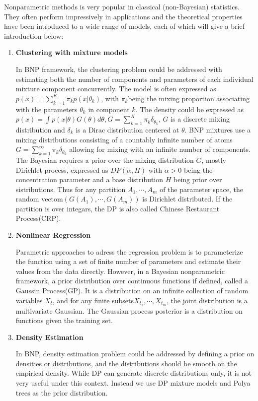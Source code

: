Nonparametric methods is very popular in classical (non-Bayesian) statistics. They often perform impressively in applications and the theoretical properties have been introduced to a wide range of models, each of which will give a brief introduction below:
\begin{enumerate}
 \item \textbf{Clustering with mixture models}
  
  In BNP framework, the clustering problem could be addressed with estimating both the number of components and parameters of each individual mixture component concurrently\cite{gershman2012tutorial,escobar1995bayesian}. The model is often expressed as $p(x)=\sum_{k=1}^{K}\pi_kp(x|\theta_k)$, with $\pi_k$being the mixing proportion associating with the parameters $\theta_k$ in component $k$. The density could be expressed as $p(x)=\int p(x|\theta)G(\theta)d\theta, G=\sum_{k=1}^{K}\pi_k\delta_{\theta_k}$, $G$ is a discrete mixing distribution and $\delta_k$ is a Dirac distribution centered at $\theta$. BNP mixtures use a mixing distributions consisting of a countably infinite number of atoms $G=\sum_{k=1}^{\infty}\pi_k\delta_{\theta_k}$ allowing for mixing with an infinite number of components. The Bayesian requires a prior over the mixing distribution $G$, mostly Dirichlet process, expressed as $DP(\alpha,H)$ with $\alpha>0$ being the concentration parameter and a base distribution $H$ being prior over sistributions. Thus for any partition $A_1,\cdots,A_m$ of the parameter space, the random vectom$(G(A_1),\cdots,G(A_m))$ is Dirichlet distributed. If the partition is over integars, the DP is also called Chinese Restaurant Process(CRP).
 \item \textbf{Nonlinear Regression}
 
 Parametric approaches to adress the regression problem is to parameterize the function using a set of finite number of parameters and estimate their values from the data directly. However, in a Bayesian nonparametric framework, a prior distribution over continuous functions if defined, called a Gaussin Process(GP)\cite{rasmussen2006gaussian}. It is a distribution on an infinite collection of random variables $X_t$, and for any finite subsets$X_{t_1},\cdots,X_{t_m}$, the joint distribution is a multivariate Gaussian. The Gaussian process posterior is a distribution on functions given the training set. 
 
 \item \textbf{Density Estimation}
 
 In BNP, density estimation problem could be addressed by defining a prior on densities or distributions, and the distributions should be smooth on the empirical density\cite{lo1984class}. While DP can generate discrete distributions only, it is not very useful under this context. Instead we use DP mixture models and Polya trees as the prior distribution\cite{ghosal1999posterior}. 
\end{enumerate}

